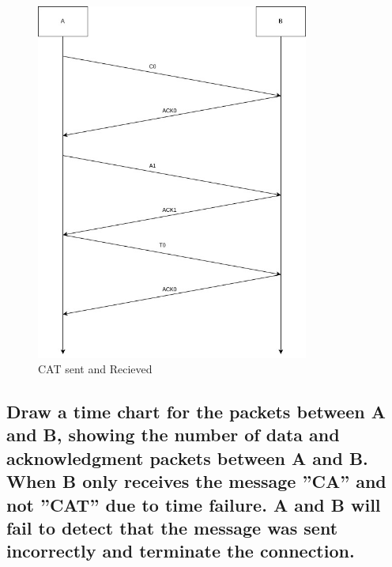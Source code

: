 \documentclass{article}
\begin{document}
\begin{figure}[H]
	\centering
	\includegraphics[width=0.8\textwidth]{question7/7a.jpg}
	\caption{CAT sent and Recieved}
	\label{fig:7a}
\end{figure}


\subsection{Draw a time chart for the packets between A and B, showing the number of
data and acknowledgment packets between A and B. When B only receives the message
”CA” and not ”CAT” due to time failure. A and B will fail to detect that the message
was sent incorrectly and terminate the connection.}
\end{document}
